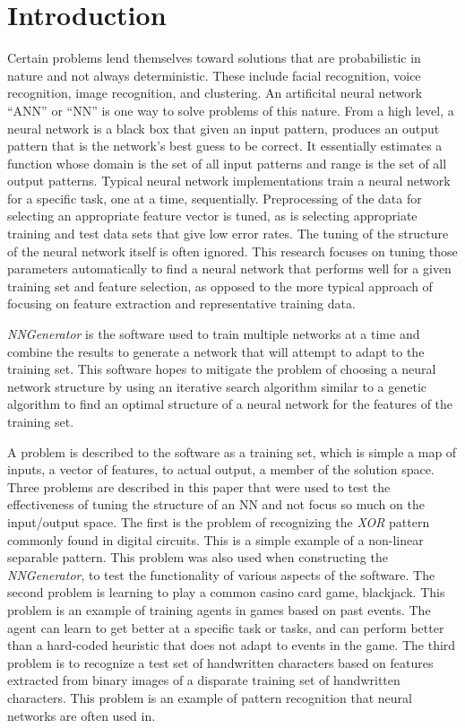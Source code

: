 \chapter[Introduction]{Introduction}
Certain problems lend themselves toward solutions that are probabilistic in nature and not always deterministic.
These include facial recognition, voice recognition, image recognition, and clustering. 
An artificital neural network ``ANN'' or ``NN'' is one way to solve problems of this nature. 
From a high level, a neural network is a black box that given an input pattern, produces an output pattern that is the network's best guess to be correct. 
It essentially estimates a function whose domain is the set of all input patterns and range is the set of all output patterns. 
Typical neural network implementations train a neural network for a specific task, one at a time, sequentially. 
Preprocessing of the data for selecting an appropriate feature vector is tuned, as is selecting appropriate training and test data sets that give low error rates. 
The tuning of the structure of the neural network itself is often ignored. 
This research focuses on tuning those parameters automatically to find a neural network that performs well for a given training set and feature selection, as opposed to the more typical approach of focusing on feature extraction and representative training data.

{\em NNGenerator} is the software used to train multiple networks at a time and combine the results to generate a network that will attempt to adapt to the training set. This software hopes to mitigate the problem of choosing a neural network structure by using an iterative search algorithm similar to a genetic algorithm to find an optimal structure of a neural network for the features of the training set. 

A problem is described to the software as a training set, which is simple a map of inputs, a vector of features, to actual output, a member of the solution space.
Three problems are described in this paper that were used to test the effectiveness of tuning the structure of an NN and not focus so much on the input/output space. 
The first is the problem of recognizing the {\it XOR} pattern commonly found in digital circuits. 
This is a simple example of a non-linear separable pattern. 
This problem was also used when constructing the {\em NNGenerator}, to test the functionality of various aspects of the software. 
The second problem is learning to play a common casino card game, blackjack. 
This problem is an example of training agents in games based on past events. 
The agent can learn to get better at a specific task or tasks, and can perform better than a hard-coded heuristic that does not adapt to events in the game. 
The third problem is to recognize a test set of handwritten characters based on features extracted from binary images of a disparate training set of handwritten characters. 
This problem is an example of pattern recognition that neural networks are often used in.

